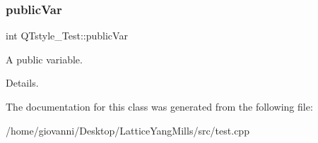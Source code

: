 \subsubsection{\texorpdfstring{public\+Var}{publicVar}}
{\footnotesize\ttfamily int Q\+Tstyle\+\_\+\+Test\+::public\+Var}



A public variable. 

Details. 

The documentation for this class was generated from the following file\+:\begin{DoxyCompactItemize}
\item 
/home/giovanni/\+Desktop/\+Lattice\+Yang\+Mills/src/test.\+cpp\end{DoxyCompactItemize}
